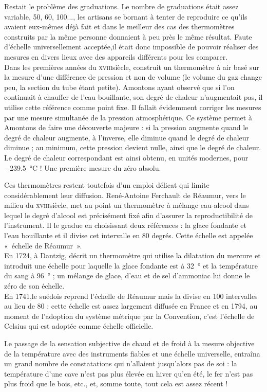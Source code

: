 	Restait le problème des graduations. Le nombre de graduations était assez variable, 50, 60, 100..., les artisans se bornant à tenter de reproduire ce qu'ils avaient eux-mêmes déjà fait et dans le meilleur des cas des thermomètres construits par la même personne donnaient à peu près le même résultat. Faute d'échelle universellement acceptée,il était donc impossible de pouvoir réaliser des mesures en divers lieux avec des appareils différents pour les comparer.\\
	Dans les premières années du \textsc{xviii}\ieme siècle,  construit un thermomètre à air basé sur la mesure d'une différence de pression et non de volume (le volume du gaz change peu, la section du tube étant petite). Amontons ayant observé que si l'on continuait à chauffer de l'eau bouillante, son degré de chaleur n'augmentait pas, il utilise cette référence comme point fixe. Il fallait évidemment corriger les mesures par une mesure simultanée de la pression atmosphérique. Ce système permet à Amontons de faire une découverte majeure : si la pression augmente quand le degré de chaleur augmente, à l'inverse, elle diminue quand le degré de chaleur diminue ; au minimum, cette pression devient nulle, ainsi que le degré de chaleur. Le degré de chaleur correspondant est ainsi obtenu, en unités modernes, pour \SI{-239,5}{\degreeCelsius} ! Une première mesure du zéro absolu.
	
	Ces thermomètres restent toutefois d'un emploi délicat qui limite considérablement leur diffusion.	René-Antoine Ferchault de Réaumur, vers le milieu du \textsc{xviii}\ieme siècle, met au point un thermomètre à mélange eau-alcool dans lequel le degré d'alcool est précisément fixé afin d'assurer la reproductibilité de l'instrument. Il le gradue en choisissant deux références : la glace fondante et l'eau bouillante et il divise cet intervalle en 80 degrés. Cette échelle est appelée «~échelle de Réaumur~».\\	
	En 1724, à Dantzig,  décrit un thermomètre qui utilise la dilatation du mercure et introduit une échelle pour laquelle la glace fondante est à \SI{32}{\degree} et la température du sang à \SI{96}{\degree} ; un mélange de glace, d'eau et de sel d'ammoniac lui donne le zéro de son échelle.\\	
	En 1741,le suédois  reprend l'échelle de Réaumur mais la divise en 100 intervalles au lieu de 80 : cette échelle est assez largement diffusée en France et en 1794, au moment de l'adoption du système métrique par la Convention, c'est l'échelle de Celsius qui est adoptée comme échelle officielle.

	Le passage de la sensation subjective de chaud et de froid à la mesure objective de la température avec des instruments fiables et une échelle universelle, entraîna un grand nombre de constatations qui n'allaient jusqu'alors pas de soi : la température d'une cave n'est pas plus élevée en hiver qu'en été, le fer n'est pas plus froid que le bois, etc., et, somme toute, tout cela est assez récent !

\atendofhistorysection

